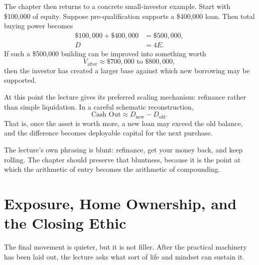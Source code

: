 The chapter then returns to a concrete small-investor example. Start with \$100,000 of equity. Suppose pre-qualification supports a \$400,000 loan. Then total buying power becomes
\begin{align}
\$100{,}000 + \$400{,}000 &= \$500{,}000,\\
D &= 4E.
\end{align}
If such a \$500,000 building can be improved into something worth
\begin{equation}
V_{\text{after}} \approx \$700{,}000\text{ to }\$800{,}000,
\end{equation}
then the investor has created a larger base against which new borrowing may be supported.

At this point the lecture gives its preferred scaling mechanism: refinance rather than simple liquidation. In a careful schematic reconstruction,
\begin{equation}
\text{Cash Out} \approx D_{\text{new}} - D_{\text{old}}.
\end{equation}
That is, once the asset is worth more, a new loan may exceed the old balance, and the difference becomes deployable capital for the next purchase.

\begin{figure}[h]
\centering
{}
\end{figure}

The lecture's own phrasing is blunt: refinance, get your money back, and keep rolling. The chapter should preserve that bluntness, because it is the point at which the arithmetic of entry becomes the arithmetic of compounding.

\section{Exposure, Home Ownership, and the Closing Ethic}

The final movement is quieter, but it is not filler. After the practical machinery has been laid out, the lecture asks what sort of life and mindset can sustain it.

